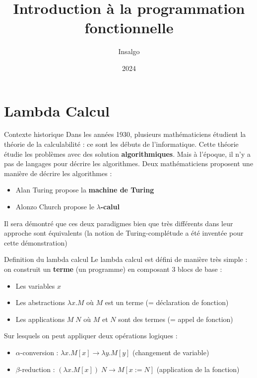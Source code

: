 \documentclass[aspectratio=169]{beamer}
\title[Smart Share]{Introduction à la programmation fonctionnelle}
\author[Insalgo]{Insalgo}
\date{2024}
\begin{document}
\frame{\titlepage}

\frame{\tableofcontents}

\section{Lambda Calcul}

\begin{frame}{Contexte historique}
    Dans les années 1930, plusieurs mathématiciens étudient la théorie de la calculabilité : ce sont les débuts de l'informatique. Cette théorie étudie les problèmes avec des solution \textbf{algorithmiques}.
    Mais à l'époque, il n'y a pas de langages pour décrire les algorithmes. Deux mathématiciens proposent une manière de décrire les algorithmes :
    \begin{itemize}
        \item Alan Turing propose la \textbf{machine de Turing}
        \item Alonzo Church propose le \textbf{$\lambda$-calul}
    \end{itemize}
    Il sera démontré que ces deux paradigmes bien que très différents dans leur approche sont équivalents (la notion de Turing-complétude a été inventée pour cette démonstration)
\end{frame}

\begin{frame}{Definition du lambda calcul}
    Le lambda calcul est défini de manière très simple : on construit un \textbf{terme} (un programme) en composant 3 blocs de base :
    \begin{itemize}
        \item Les variables $x$
        \item Les abstractions $\lambda x.M$ où $M$ est un terme (= déclaration de fonction)
        \item Les applications $M\;N$ où $M$ et $N$ sont des termes (= appel de fonction)
    \end{itemize}
    Sur lesquels on peut appliquer deux opérations logiques :
    \begin{itemize}
        \item $\alpha$-conversion : $\lambda x.M[x] \rightarrow \lambda y.M[y]$ (changement de variable)
        \item $\beta$-reduction : $(\lambda x.M[x])\;N \rightarrow M[x:=N]$ (application de la fonction)
    \end{itemize}
\end{frame}
\end{document}

